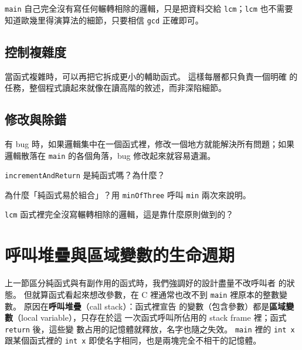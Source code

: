 
\texttt{main} 自己完全沒有寫任何輾轉相除的邏輯，只是把資料交給
\texttt{lcm}；\texttt{lcm} 也不需要知道歐幾里得演算法的細節，只要相信
\texttt{gcd} 正確即可。

\subsection{控制複雜度}

當函式複雜時，可以再把它拆成更小的輔助函式。 這樣每層都只負責一個明確
的任務，整個程式讀起來就像在讀高階的敘述，而非深陷細節。

\subsection{修改與除錯}

有 bug 時，如果邏輯集中在一個函式裡，修改一個地方就能解決所有問題；如果
邏輯散落在 \texttt{main} 的各個角落，bug 修改起來就容易遺漏。


\begin{drills}[label=drills:func-benefits]
\item \texttt{incrementAndReturn} 是純函式嗎？為什麼？
\item 為什麼「純函式易於組合」？用 \texttt{minOfThree} 呼叫
\texttt{min} 兩次來說明。
\item \texttt{lcm} 函式裡完全沒寫輾轉相除的邏輯，這是靠什麼原則做到的？
\end{drills}

\section{呼叫堆疊與區域變數的生命週期}
\label{sec:func-callstack}

上一節區分純函式與有副作用的函式時，我們強調好的設計盡量不改呼叫者
的狀態。 但就算函式看起來想改參數，在 C 裡通常也改不到 \texttt{main}
裡原本的整數變數。 原因在\textbf{呼叫堆疊}（call stack）：函式裡宣告
的變數（包含參數）都是\textbf{區域變數}（local variable），只存在於這
一次函式呼叫所佔用的 stack frame 裡；函式 \texttt{return} 後，這些變
數占用的記憶體就釋放，名字也隨之失效。 \texttt{main} 裡的 \texttt{int x}
跟某個函式裡的 \texttt{int x} 即使名字相同，也是兩塊完全不相干的記憶體。

